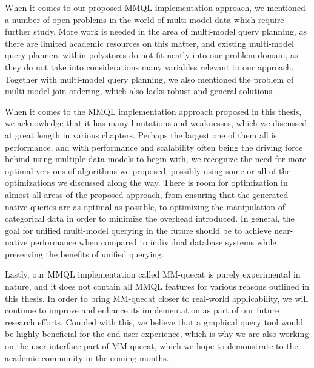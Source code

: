 When it comes to our proposed MMQL implementation approach, we mentioned a number of open problems in the world of multi-model data which require further study.
More work is needed in the area of multi-model query planning, as there are limited academic resources on this matter, and existing multi-model query planners within polystores do not fit neatly into our problem domain, as they do not take into considerations many variables relevant to our approach.
Together with multi-model query planning, we also mentioned the problem of multi-model join ordering, which also lacks robust and general solutions.

When it comes to the MMQL implementation approach proposed in this thesis, we acknowledge that it has many limitations and weaknesses, which we discussed at great length in various chapters.
Perhaps the largest one of them all is performance, and with performance and scalability often being the driving force behind using multiple data models to begin with, we recognize the need for more optimal versions of algorithms we proposed, possibly using some or all of the optimizations we discussed along the way.
There is room for optimization in almost all areas of the proposed approach, from ensuring that the generated native queries are as optimal as possible, to optimizing the manipulation of categorical data in order to minimize the overhead introduced.
In general, the goal for unified multi-model querying in the future should be to achieve near-native performance when compared to individual database systems while preserving the benefits of unified querying.

Lastly, our MMQL implementation called MM-quecat is purely experimental in nature, and it does not contain all MMQL features for various reasons outlined in this thesis.
In order to bring MM-quecat closer to real-world applicability, we will continue to improve and enhance its implementation as part of our future research efforts.
Coupled with this, we believe that a graphical query tool would be highly beneficial for the end user experience, which is why we are also working on the user interface part of MM-quecat, which we hope to demonstrate to the academic community in the coming months.
